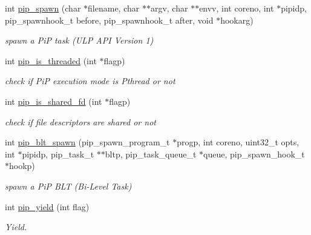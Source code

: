 \begin{DoxyCompactItemize}
\item 
int \hyperlink{group__libpip_gae9187ea22ecf0623fa3ecfba5337f52d}{pip\-\_\-spawn} (char $\ast$filename, char $\ast$$\ast$argv, char $\ast$$\ast$envv, int coreno, int $\ast$pipidp, pip\-\_\-spawnhook\-\_\-t before, pip\-\_\-spawnhook\-\_\-t after, void $\ast$hookarg)
\begin{DoxyCompactList}\small\item\em spawn a Pi\-P task (U\-L\-P A\-P\-I Version 1) \end{DoxyCompactList}\end{DoxyCompactItemize}
\begin{DoxyCompactItemize}
\item 
int \hyperlink{group__libpip_ga0455093d5040ae45585cc88a5f3f002b}{pip\-\_\-is\-\_\-threaded} (int $\ast$flagp)
\begin{DoxyCompactList}\small\item\em check if Pi\-P execution mode is Pthread or not \end{DoxyCompactList}\end{DoxyCompactItemize}
\begin{DoxyCompactItemize}
\item 
int \hyperlink{group__libpip_ga180ece8f3f537d84db8e70921f3ae099}{pip\-\_\-is\-\_\-shared\-\_\-fd} (int $\ast$flagp)
\begin{DoxyCompactList}\small\item\em check if file descriptors are shared or not \end{DoxyCompactList}\end{DoxyCompactItemize}
\begin{DoxyCompactItemize}
\item 
int \hyperlink{group__libpip_gaceaa2ec686f001439d6ea89d47e71f65}{pip\-\_\-blt\-\_\-spawn} (pip\-\_\-spawn\-\_\-program\-\_\-t $\ast$progp, int coreno, uint32\-\_\-t opts, int $\ast$pipidp, pip\-\_\-task\-\_\-t $\ast$$\ast$bltp, pip\-\_\-task\-\_\-queue\-\_\-t $\ast$queue, pip\-\_\-spawn\-\_\-hook\-\_\-t $\ast$hookp)
\begin{DoxyCompactList}\small\item\em spawn a Pi\-P B\-L\-T (Bi-\/\-Level Task) \end{DoxyCompactList}\end{DoxyCompactItemize}
\begin{DoxyCompactItemize}
\item 
int \hyperlink{group__libpip_ga50469f21446ce86ea18ddd282cf15894}{pip\-\_\-yield} (int flag)
\begin{DoxyCompactList}\small\item\em Yield. \end{DoxyCompactList}\end{DoxyCompactItemize}
